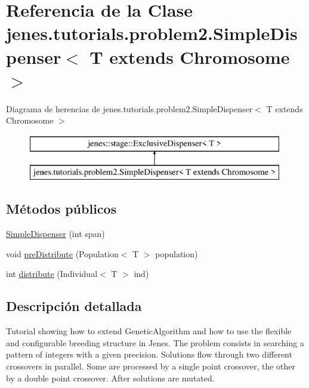 \hypertarget{classjenes_1_1tutorials_1_1problem2_1_1_simple_dispenser_3_01_t_01extends_01_chromosome_01_4}{\section{Referencia de la Clase jenes.\-tutorials.\-problem2.\-Simple\-Dispenser$<$ T extends Chromosome $>$}
\label{classjenes_1_1tutorials_1_1problem2_1_1_simple_dispenser_3_01_t_01extends_01_chromosome_01_4}
}
Diagrama de herencias de jenes.\-tutorials.\-problem2.\-Simple\-Dispenser$<$ T extends Chromosome $>$\begin{figure}[H]
\begin{center}
\leavevmode
\includegraphics[height=2.000000cm]{classjenes_1_1tutorials_1_1problem2_1_1_simple_dispenser_3_01_t_01extends_01_chromosome_01_4}
\end{center}
\end{figure}
\subsection*{Métodos públicos}
\begin{DoxyCompactItemize}
\item 
\hyperlink{classjenes_1_1tutorials_1_1problem2_1_1_simple_dispenser_3_01_t_01extends_01_chromosome_01_4_a0c8ee6561c4336810cacc9fb7dad7993}{Simple\-Dispenser} (int span)
\item 
void \hyperlink{classjenes_1_1tutorials_1_1problem2_1_1_simple_dispenser_3_01_t_01extends_01_chromosome_01_4_adeddb967a293817fab3f83bd9a04736d}{pre\-Distribute} (Population$<$ T $>$ population)
\item 
int \hyperlink{classjenes_1_1tutorials_1_1problem2_1_1_simple_dispenser_3_01_t_01extends_01_chromosome_01_4_a36cc589e5e73dd601e4bbf62835329ca}{distribute} (Individual$<$ T $>$ ind)
\end{DoxyCompactItemize}


\subsection{Descripción detallada}
Tutorial showing how to extend {\ttfamily Genetic\-Algorithm} and how to use the flexible and configurable breeding structure in Jenes. The problem consists in searching a pattern of integers with a given precision. Solutions flow through two different crossovers in parallel. Some are processed by a single point crossover, the other by a double point crossover. After solutions are mutated.

